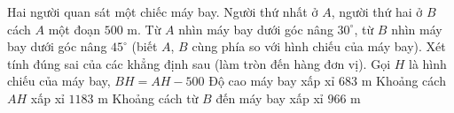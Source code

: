 \begin{ex}%
	Hai người quan sát một chiếc máy bay. Người thứ nhất ở $A$, người thứ hai ở $B$ cách $A$ một đoạn $500$ m. Từ $A$ nhìn máy bay dưới góc nâng $30^\circ$, từ $B$ nhìn máy bay dưới góc nâng $45^\circ$ (biết $A$, $B$ cùng phía so với hình chiếu của máy bay). Xét tính đúng sai của các khẳng định sau (làm tròn đến hàng đơn vị).
	\choiceTF
		{\True Gọi $H$ là hình chiếu của máy bay, $BH=AH-500$}
		{\True Độ cao máy bay xấp xỉ $683$ m}
		{\True Khoảng cách $AH$ xấp xỉ $1183$ m}
		{Khoảng cách từ $B$ đến máy bay xấp xỉ $966$ m}
\end{ex}
